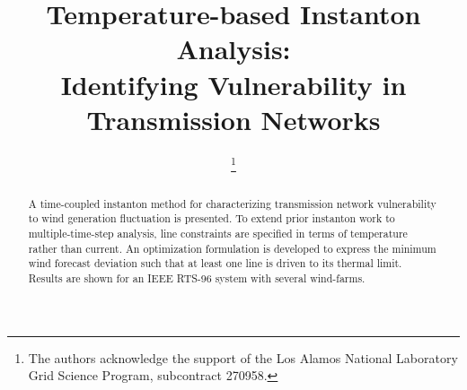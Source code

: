 \documentclass[conference]{IEEEtran}
\begin{document}
%
\title{Temperature-based Instanton Analysis: \\
Identifying Vulnerability in Transmission Networks}


\author{%

\and
{}
\and
{}

%

\thanks{The authors acknowledge the support of the Los Alamos National Laboratory Grid Science Program, subcontract 270958.}%
}

\maketitle

\begin{abstract}
A time-coupled instanton method for characterizing transmission network vulnerability to wind generation fluctuation is presented. To extend prior instanton work to multiple-time-step analysis, line constraints are specified in terms of temperature rather than current. An optimization formulation is developed to express the minimum wind forecast deviation such that at least one line is driven to its thermal limit. Results are shown for an IEEE RTS-96 system with several wind-farms.
\end{abstract}
\end{document}
